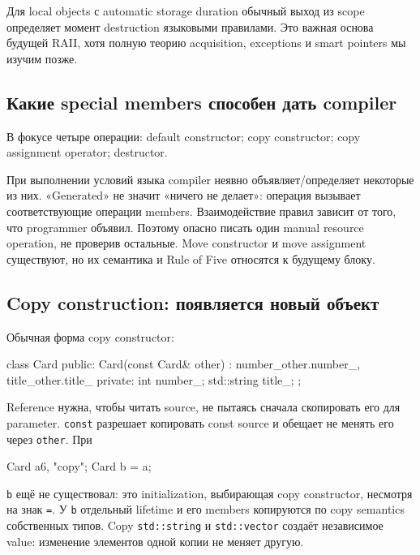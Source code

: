\begin{standardbox}
Для local objects с automatic storage duration обычный выход из scope
определяет момент destruction языковыми правилами. Это важная основа будущей
RAII, хотя полную теорию acquisition, exceptions и smart pointers мы изучим
позже.
\end{standardbox}

\subsection{Какие special members способен дать compiler}

В фокусе четыре операции:
default constructor; copy constructor; copy assignment operator; destructor.

При выполнении условий языка compiler неявно объявляет/определяет некоторые
из них. «Generated» не значит «ничего не делает»: операция вызывает
соответствующие операции members. Взаимодействие правил зависит от того, что
programmer объявил. Поэтому опасно писать один manual resource operation, не
проверив остальные. Move constructor и move assignment существуют, но их
семантика и Rule of Five относятся к будущему блоку.

\subsection{Copy construction: появляется новый объект}

Обычная форма copy constructor:

\begin{cppcode}
class Card {
public:
    Card(const Card& other)
        : number_{other.number_}, title_{other.title_} {}
private:
    int number_;
    std::string title_;
};
\end{cppcode}

Reference нужна, чтобы читать source, не пытаясь сначала скопировать его для
parameter. \texttt{const} разрешает копировать const source и обещает не
менять его через \texttt{other}. При

\begin{cppcode}
Card a{6, "copy"};
Card b = a;
\end{cppcode}

\texttt{b} ещё не существовал: это initialization, выбирающая copy
constructor, несмотря на знак \texttt{=}. У \texttt{b} отдельный lifetime и
его members копируются по copy semantics собственных типов. Copy
\texttt{std::string} и \texttt{std::vector} создаёт независимое value:
изменение элементов одной копии не меняет другую.


